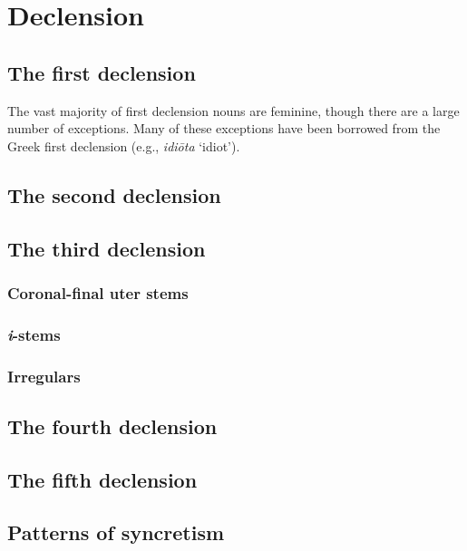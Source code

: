 \chapter{Declension}

\section{The first declension}

The vast majority of first declension nouns are feminine, though there are a large number of exceptions. Many of these exceptions have been borrowed from the Greek first declension (e.g., \emph{idiōta} `idiot').



\section{The second declension}


\section{The third declension}

\subsection{Coronal-final uter stems}

\subsection{\emph{i}-stems}

\subsection{Irregulars}

\section{The fourth declension}

\section{The fifth declension}

\section{Patterns of syncretism}
